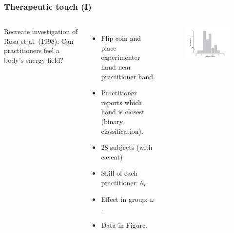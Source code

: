 \documentclass[usenames,dvipsnames,table]{beamer}
\begin{document}
\begin{frame}
\frametitle{Therapeutic touch (I)}
\begin{columns}[c]
Recreate investigation of Rosa et al. (1998): Can practitioners feel a body's energy field?

\begin{itemize}
\item Flip coin and place experimenter hand near practitioner hand.
\item Practitioner reports which hand is closest (binary classification).
\item 28 subjects (with caveat)
\item Skill of each practitioner: $\theta_s$.
\item Effect in group: $\omega$.
\item Data in Figure.
\end{itemize}
\begin{figure}
\centering
\includegraphics[width=\linewidth]{img/fig9_9}
\end{figure}
\end{columns}
\end{frame}
\end{document}
